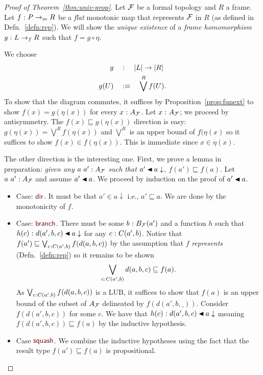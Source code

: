 \begin{proof}[Proof of Theorem~\ref{thm:univ-prop}]
  Let $\mathcal{F}{}$ be a formal topology and $R$ a frame. Let $f\hspace{0.1mm}:\hspace{0.1mm}P \rightarrow_m R$ be a
  \emph{flat} monotonic map that represents $\mathcal{F}{}$ in $R$
  (as defined in Defn.~\ref{defn:rep}). We will show the \emph{unique existence} of a
  \emph{frame homomorphism} $g\hspace{0.1mm}:\hspace{0.1mm}L \rightarrow_f R$ such that $f = g \circ \eta$.

  We choose
  \begin{align*}
    g    \quad&:\quad \left| L \right| \rightarrow \left| R \right| \\
    g(U) \quad&:\equiv\quad \bigvee^R f(U)        .
  \end{align*}
  To show that the diagram commutes, it suffices by Proposition~\ref{prop:funext} to show
  $f(x) = g(\eta(x))$ for every $x\hspace{0.1mm}:\hspace{0.1mm}A_{\mathcal{F}{}}$. Let $x\hspace{0.1mm}:\hspace{0.1mm}A_{\mathcal{F}{}}$; we
  proceed by antisymmetry. The $f(x) \sqsubseteq g(\eta(x))$ direction is easy: $g(\eta(x)) = \bigvee^R f(\eta(x))$
  and $\bigvee^R$ is an upper bound of $f(\eta(x)$ so it suffices to show $f(x) \in f(\eta(x))$. This is
  immediate since $x \in \eta(x)$.

  The other direction is the interesting one. First, we prove a lemma in preparation:
  \emph{given any $a~a':A_{\mathcal{F}{}}$ such that $\covers{a'}{a\downarrow}$, $f(a') \sqsubseteq f(a)$}.
  Let $a~a':A_{\mathcal{F}{}}$ and assume $\covers{a'}{a}$. We proceed by induction on
  the proof of $\covers{a'}{a}$.
  \begin{itemize}
    \item Case: $\ruledir{}$. It must be that $a' \in a \downarrow$ i.e., $a' \sqsubseteq a$. We are done by
      the monotonicity of $f$.
    \item Case: $\rulebranch{}$. There must be some $b\hspace{0.1mm}:\hspace{0.1mm}B_{\mathcal{F}{}}(a')$ and a
      function $h$ such that $\oftyI{h(c)}{\covers{d(a', b, c)}{a\downarrow}}$ for any
      $c\hspace{0.1mm}:\hspace{0.1mm}C(a', b)$. Notice that $f(a') \sqsubseteq \bigvee_{c\hspace{0.1mm}:\hspace{0.1mm}C(a', b)}f(d(a, b, c))$ by
      the assumption that $f$ \emph{represents} (Defn.~\ref{defn:rep}) so it remains to be
      shown $$\bigvee_{c\hspace{0.1mm}:\hspace{0.1mm}C(a', b)}d(a, b, c) \sqsubseteq f(a).$$ As
      $\bigvee_{c\hspace{0.1mm}:\hspace{0.1mm}C(a', b)}f(d(a, b, c))$ is a LUB, it suffices to show that $f(a)$ is an
      upper bound of the subset of $A_{\mathcal{F}{}}$ delineated by $f(d(a', b, \_))$.
      Consider $f(d(a', b, c))$ for some $c$. We have that $\oftyI{h(c)}{\covers{d(a', b,
          c)}{a\downarrow}}$ meaning $f(d(a', b, c)) \sqsubseteq f(a)$ by the inductive hypothesis.
    \item Case $\rulesquash{}$. We combine the inductive hypotheses using the fact that
      the result type $f(a') \sqsubseteq f(a)$ is propositional.
  \end{itemize}


\end{proof}
